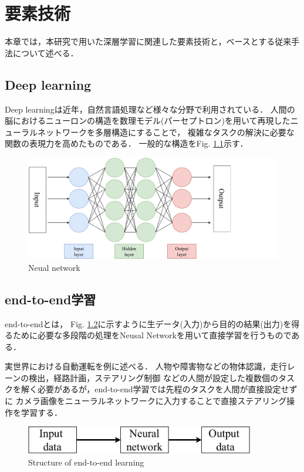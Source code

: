 \chapter{要素技術}
本章では，本研究で用いた深層学習に関連した要素技術と，ベースとする従来手法について述べる．

\section{Deep learning}
Deep learningは近年，自然言語処理など様々な分野で利用されている．
人間の脳におけるニューロンの構造を数理モデル(パーセプトロン)を用いて再現したニューラルネットワークを多層構造にすることで，
複雑なタスクの解決に必要な関数の表現力を高めたものである．
一般的な構造をFig. \ref{fig::network}示す．

\begin{figure}[h]
    \centering
    \includegraphics[width = 12cm]{./figs/network.pdf}
    \caption{Neual network}
    \label{fig::network}
\end{figure}

\section{end-to-end学習}
end-to-endとは，
Fig. \ref{fig::e2e}に示すように生データ(入力)から目的の結果(出力)を得るために必要な多段階の処理をNeusal Networkを用いて直接学習を行うものである．

実世界における自動運転を例に述べる．
人物や障害物などの物体認識，走行レーンの検出，経路計画，ステアリング制御
などの人間が設定した複数個のタスクを解く必要があるが，end-to-end学習では先程のタスクを人間が直接設定せずに
カメラ画像をニューラルネットワークに入力することで直接ステアリング操作を学習する．

\vspace{2.0zh}
\begin{figure}[h]
    \centering
    \includegraphics[width = 10cm]{./figs/e2e.pdf}
    \caption{Structure of end-to-end learning}
    \label{fig::e2e}
\end{figure}

